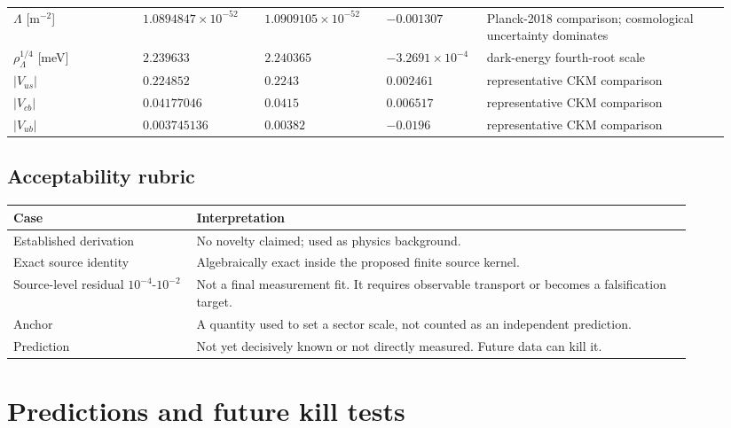 \documentclass[11pt]{article}
\begin{document}
\begin{landscape}
\begin{longtable}{p{0.17\linewidth}p{0.16\linewidth}p{0.16\linewidth}p{0.13\linewidth}p{0.32\linewidth}}
$\Lambda$ [m$^{-2}$] & $1.0894847\times 10^{-52}$ & $1.0909105\times 10^{-52}$ & $-0.001307$ & Planck-2018 comparison; cosmological uncertainty dominates \\
$\rho_\Lambda^{1/4}$ [meV] & $2.239633$ & $2.240365$ & $-3.2691\times 10^{-4}$ & dark-energy fourth-root scale \\
$|V_{us}|$ & $0.224852$ & $0.2243$ & $0.002461$ & representative CKM comparison \\
$|V_{cb}|$ & $0.04177046$ & $0.0415$ & $0.006517$ & representative CKM comparison \\
$|V_{ub}|$ & $0.003745136$ & $0.00382$ & $-0.0196$ & representative CKM comparison \\
\bottomrule
\end{longtable}
\normalsize
\end{landscape}

\subsection{Acceptability rubric}

\begin{center}
\begin{tabular}{p{0.24\linewidth}p{0.65\linewidth}}
\toprule
Case & Interpretation\\
\midrule
Established derivation & No novelty claimed; used as physics background.\\
Exact source identity & Algebraically exact inside the proposed finite source kernel.\\
Source-level residual \(10^{-4}\)-\(10^{-2}\) & Not a final measurement fit. It requires observable transport or becomes a falsification target.\\
Anchor & A quantity used to set a sector scale, not counted as an independent prediction.\\
Prediction & Not yet decisively known or not directly measured. Future data can kill it.\\
\bottomrule
\end{tabular}
\end{center}

\section{Predictions and future kill tests}
\end{document}

